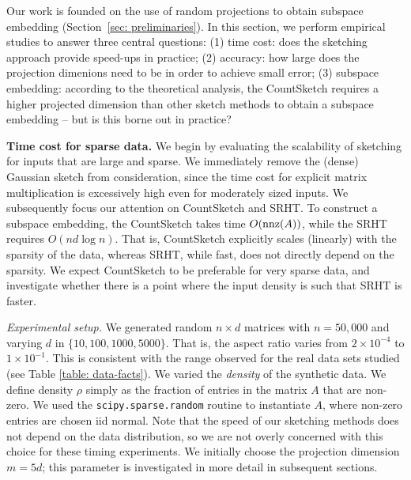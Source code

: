 \newcommand{\eat}[1]{}
\newcommand{\SRHT}{SRHT\xspace}

Our work is founded on the use of random projections to obtain
subspace embedding (Section~\ref{sec: preliminaries}).
In this section, we perform empirical studies to answer three central
questions:
(1) time cost: does the sketching approach provide speed-ups in
practice;
(2) accuracy: how large does the projection dimenions need to be in
order to achieve small error;
(3) subspace embedding:
according to the theoretical analysis, the CountSketch requires a
higher projected dimension than other sketch methods to obtain a
subspace embedding -- but is this borne out in practice? 

\eat{
As outlined in Section \ref{sec: preliminaries} the key quantity that we would
like to understand is the subspace embedding.
The central questions we seek to answer are: (1) whether the time complexity
in practise matches the theory, (2) how large should the projection
dimension be in order to obtain small error (3) the CountSketch
theoretically requires a larger projection to obtain the subspace embedding
property, is this reflected in practise?}

\medskip
\noindent\textbf{Time cost for sparse data.}
We begin by evaluating the scalability of sketching for inputs that
are large and sparse.
We immediately remove the (dense) Gaussian sketch from consideration,
since the time cost for explicit matrix multiplication is excessively
high even for moderately sized inputs.
We subsequently focus our attention on CountSketch and \SRHT. 
To construct a subspace embedding, 
the CountSketch takes
time $O(\text{nnz}(A))$, while the \SRHT requires $O(nd \log n)$.
That is, CountSketch explicitly scales (linearly) with the sparsity of
the data, whereas \SRHT, while fast, does not directly depend on the
sparsity.
We expect CountSketch to be preferable for very sparse data,
and investigate whether there is a point where the input density is
such that \SRHT is faster. 

\noindent
\textit{Experimental setup.}
We generated random $n \times d$ matrices with $n=50,000$ and varying $d$
in $\{ 10, 100, 1000, 5000 \}$.
That is, the aspect ratio varies from $2 \times 10^{-4}$ to $1\times
10^{-1}$.
This is consistent with the range observed for the real data sets studied (see
Table \ref{table: data-facts}). 
We varied the \textit{density} of the synthetic data.
We define density $\rho$ simply as the fraction of entries in the matrix $A$
that are non-zero.
We used the \texttt{scipy.sparse.random} routine to instantiate $A$,
where non-zero entries are chosen iid normal. 
Note that the speed of our sketching methods does not depend on the data
distribution, so we are not overly concerned with this choice for
these timing experiments. 
We initially choose the projection dimension $m = 5d$; this parameter
is investigated in more detail in subsequent sections. 


